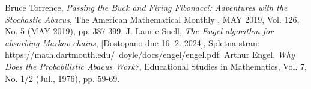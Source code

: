\documentclass[twoside,11pt]{article}
\begin{document}
\begin{thebibliography}{99}

 Bruce Torrence, \emph{Passing the Buck and Firing Fibonacci: Adventures with the Stochastic Abacus}, The American Mathematical Monthly , MAY 2019, Vol. 126, No. 5 (MAY 2019), pp. 387-399.
 J. Laurie Snell, \emph{The Engel algorithm for absorbing Markov chains}, [Dostopano dne 16. 2. 2024], Spletna stran: https://math.dartmouth.edu/~doyle/docs/engel/engel.pdf. 
 Arthur Engel, \emph{Why Does the Probabilistic Abacus Work?},  Educational Studies in Mathematics, Vol. 7, No. 1/2 (Jul., 1976), pp. 59-69. 

\end{thebibliography}
\end{document}
